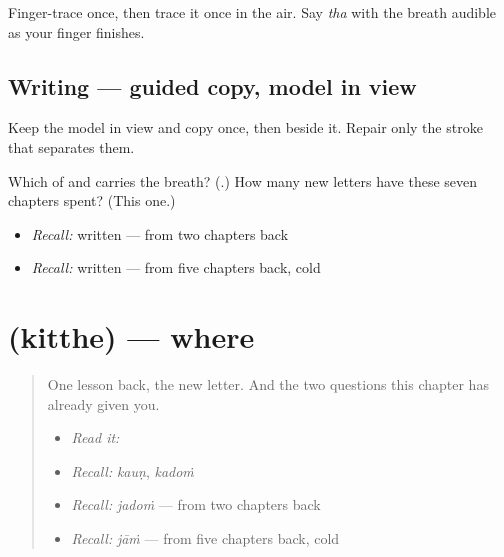 Finger-trace \textbf{} once, then trace it once in the air. Say \emph{tha} with the breath audible as your finger finishes.

\subsection*{Writing — guided copy, model in view}
Keep the model in view and copy \textbf{} once, then \textbf{} beside it. Repair only the stroke that separates them.

\begin{tcolorbox}[breakable,colback=teal!4,colframe=teal!35!black,title={Before you move on}]
Which of \textbf{} and \textbf{} carries the breath? (\textbf{}.) How many new letters have these seven chapters spent? (This one.)

\begin{itemize}
\raggedright
  \item \emph{Recall:} \textbf{} written — from two chapters back
  \item \emph{Recall:} \textbf{} written — from five chapters back, cold
\end{itemize}
\end{tcolorbox}
\section[\texorpdfstring{\pa{ਕਿੱਥੇ} (kitthe)}{ਕਿੱਥੇ (kitthe)}]{ (kitthe) — where}

\label{lesson:PA-C43-kitthe}



\begin{quote}
One lesson back, the new letter. And the two questions this chapter has already given you.

\begin{itemize}
\raggedright
  \item \emph{Read it:} \textbf{}
  \item \emph{Recall:} \emph{kauṇ}, \emph{kadoṁ}
  \item \emph{Recall:} \emph{jadoṁ} — from two chapters back
  \item \emph{Recall:} \emph{jāṁ} — from five chapters back, cold
\end{itemize}
\end{quote}

